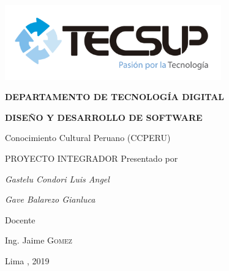 \begin{titlepage}
	\centering
	\includegraphics[width=0.70\textwidth]{img/logo_tecsup_final}\par\vspace{1cm}
	\vspace{0.30cm}	
	{\scshape\large\bfseries DEPARTAMENTO DE TECNOLOG\'IA DIGITAL \par}
	\vspace{0.60cm}	
	{\scshape\large\bfseries DISEÑO Y DESARROLLO DE SOFTWARE  \par}
	\vspace{2.00cm}		
	{\large\large Conocimiento Cultural Peruano (CCPERU) \par}
	\vspace{0.60cm}
	{\scshape\large PROYECTO INTEGRADOR }
	\vspace{0.60cm}
	\vfill
	Presentado por \par
	{\large\itshape { Gastelu Condori Luis Angel }\par}
	{\large\itshape { Gave Balarezo Gianluca }\par}
	\vspace{0.30cm}
	\vfill
	Docente \par
	Ing. Jaime \textsc{ Gomez}
	
  \vspace{0.30cm}
	\vfill
        {\large Lima , 2019 \par}
\end{titlepage}

